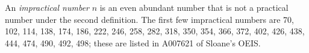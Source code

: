 \documentclass[12pt]{article}
\begin{document}
An {\em impractical number} $n$ is an even abundant number that is not a practical number under the second definition. The first few impractical numbers are 70, 102, 114, 138, 174, 186, 222, 246, 258, 282, 318, 350, 354, 366, 372, 402, 426, 438, 444, 474, 490, 492, 498; these are listed in A007621 of Sloane's OEIS.
\end{document}
